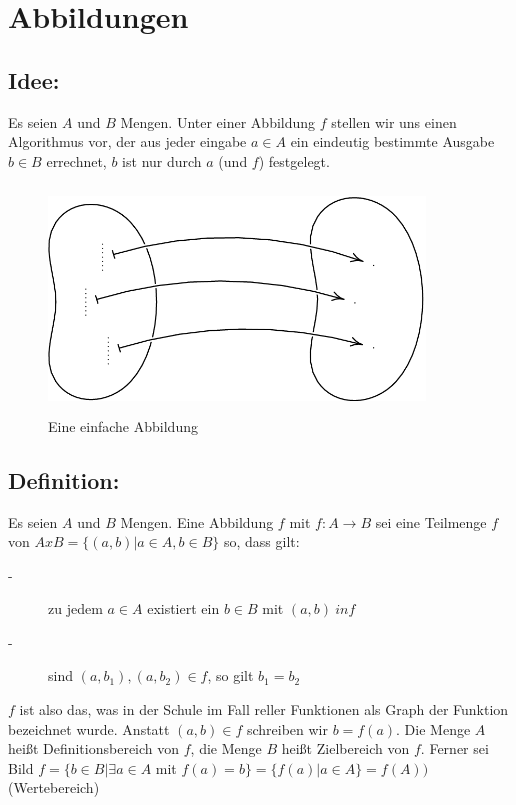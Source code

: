\section{Abbildungen}

\subsection{Idee:}
Es seien $A$ und $B$ Mengen. Unter einer Abbildung $f$ stellen wir uns einen Algorithmus vor, der aus jeder eingabe $a \in A$ ein eindeutig bestimmte Ausgabe $b \in B$ errechnet, $b$ ist nur durch $a$ (und $f$) festgelegt.

\begin{figure} [H]
\centering 
\includegraphics[width=10cm, height=6cm]{mainmatter/chapter1/pics/abbildunggenerell.png}
\caption{Eine einfache Abbildung} 
\end{figure}
%
%
%
\subsection{Definition:}

Es seien $A$ und $B$ Mengen. Eine Abbildung $f$ mit $ f:A \rightarrow B $ sei eine Teilmenge $f$ von $AxB = \{ (a,b) | a \in A, b \in B \}$ so, dass gilt:

\begin{description} 
\item[-] zu jedem $a \in A$ existiert ein $b \in B$ mit $(a,b) \ in f$ 
\item[-] sind $(a,b_{1}), (a,b_{2}) \in f$, so gilt $b_{1} = b_{2}$
\end{description}

$f$ ist also das, was in der Schule im Fall reller Funktionen als Graph der Funktion bezeichnet wurde. Anstatt $(a,b) \in f$ schreiben wir $b = f(a)$. Die Menge $A$ heißt Definitionsbereich von $f$, die Menge $B$ heißt Zielbereich von $f$. Ferner sei Bild $f = \{b \in B | \exists a \in A$ mit $f(a) = b\} = \{f(a) |  a \in A\} = f(A))$ (Wertebereich)
%
%
%
